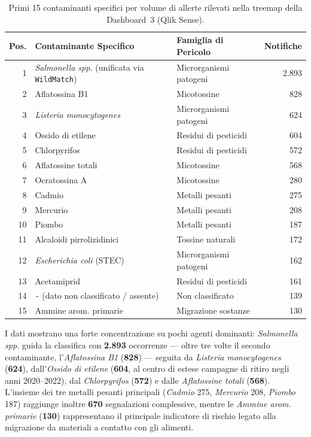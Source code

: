 \begin{table}[htbp]
\centering
\caption{Primi 15 contaminanti specifici per volume di allerte rilevati nella treemap della Dashboard~3 (Qlik Sense).}
\label{tab:qlik_top15_contaminants}
\begin{tabularx}{\textwidth}{@{}rXlr@{}}
\toprule
\textbf{Pos.} & \textbf{Contaminante Specifico} & \textbf{Famiglia di Pericolo} & \textbf{Notifiche} \\
\midrule
1 & \textit{Salmonella spp.} (unificata via \texttt{WildMatch}) & Microrganismi patogeni & 2.893 \\
2 & Aflatossina B1 & Micotossine & 828 \\
3 & \textit{Listeria monocytogenes} & Microrganismi patogeni & 624 \\
4 & Ossido di etilene & Residui di pesticidi & 604 \\
5 & Chlorpyrifos & Residui di pesticidi & 572 \\
6 & Aflatossine totali & Micotossine & 568 \\
7 & Ocratossina A & Micotossine & 280 \\
8 & Cadmio & Metalli pesanti & 275 \\
9 & Mercurio & Metalli pesanti & 208 \\
10 & Piombo & Metalli pesanti & 187 \\
11 & Alcaloidi pirrolizidinici & Tossine naturali & 172 \\
12 & \textit{Escherichia coli} (STEC) & Microrganismi patogeni & 162 \\
13 & Acetamiprid & Residui di pesticidi & 161 \\
14 & \texttt{-} (dato non classificato / assente) & Non classificato & 139 \\
15 & Ammine arom. primarie & Migrazione sostanze & 130 \\
\bottomrule
\end{tabularx}
\end{table}

I dati mostrano una forte concentrazione su pochi agenti dominanti: \textit{Salmonella spp.} guida la classifica con \textbf{2.893} occorrenze --- oltre tre volte il secondo contaminante, l'\textit{Aflatossina B1} (\textbf{828}) --- seguita da \textit{Listeria monocytogenes} (\textbf{624}), dall'\textit{Ossido di etilene} (\textbf{604}, al centro di estese campagne di ritiro negli anni 2020--2022), dal \textit{Chlorpyrifos} (\textbf{572}) e dalle \textit{Aflatossine totali} (\textbf{568}). L'insieme dei tre metalli pesanti principali (\textit{Cadmio} 275, \textit{Mercurio} 208, \textit{Piombo} 187) raggiunge inoltre \textbf{670} segnalazioni complessive, mentre le \textit{Ammine arom. primarie} (\textbf{130}) rappresentano il principale indicatore di rischio legato alla migrazione da materiali a contatto con gli alimenti.

